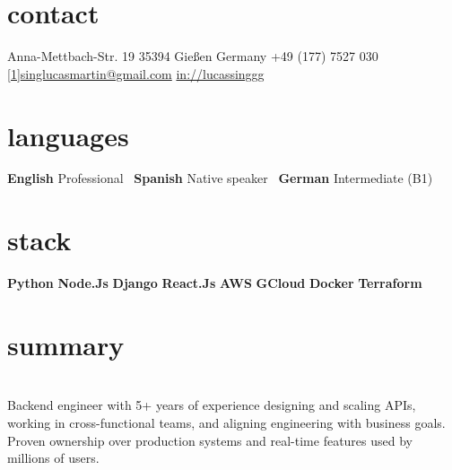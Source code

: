 \documentclass[a4paper,nocolors]{friggeri-cv}
\begin{document}


\begin{aside} %
\section{contact}
\pin \hfill Anna-Mettbach-Str. 19
35394 Gießen
Germany\vspace{0.5em}
{\Large\textcolor{gray}{\Mobilefone}} \hfill +49 (177) 7527 030
\hfill \href{mailto:singlucasmartin@gmail.com}{\scalebox{0.9}[1]{singlucasmartin@gmail.com}}\vspace{0.75em}
\llogo \hfill \href{https://www.linkedin.com/in/lucassinggg}{in://lucassinggg}\vspace{2em}
\section{languages}
\textbf{English} \hfill Professional~
\textbf{Spanish} \hfill Native speaker~
\textbf{German} \hfill Intermediate (B1)~\vspace{2em}
\section{stack}
\textbf{Python} \hfill \filleddot \filleddot \filleddot \filleddot \emptydot
\textbf{Node.Js} \hfill \filleddot \filleddot \filleddot \emptydot \emptydot
\textbf{Django} \hfill \filleddot \filleddot \filleddot \filleddot \filleddot
\textbf{React.Js} \hfill \filleddot \filleddot \filleddot \emptydot \emptydot
\textbf{AWS} \hfill \filleddot \filleddot \filleddot \emptydot \emptydot
\textbf{GCloud} \hfill \filleddot \filleddot \filleddot \emptydot \emptydot
\textbf{Docker} \hfill \filleddot \filleddot \filleddot \filleddot \emptydot
\textbf{Terraform} \hfill \filleddot \emptydot \emptydot \emptydot \emptydot
\end{aside}

\section{summary}
\vspace{1em}
\\
Backend engineer with 5+ years of experience designing and scaling APIs, working in cross-functional teams, and aligning engineering with business goals. Proven ownership over production systems and real-time features used by millions of users.
\vspace{0.5em}
\end{document}
